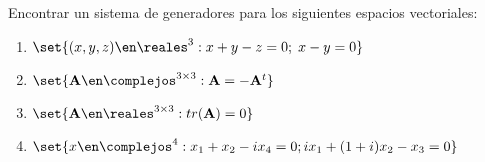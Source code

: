 \begin{enunciado}{\ejercicio}
  Encontrar un sistema de generadores para los siguientes espacios vectoriales:
  \begin{enumerate}[label=(\alph*)]
    \item $\set{(x,y,z) \en \reales^3 : x + y - z = 0;\; x - y = 0}$

    \item $\set{\mathbf{A} \en \complejos^{3 \times 3} : \mathbf{A} = - \mathbf{A}^t}$

    \item $\set{\mathbf{A} \en \reales^{3 \times 3} : tr(\mathbf{A}) = 0}$

    \item $\set{x \en \complejos^4 : x_1 + x_2 - i x_4 = 0; ix_1 + (1+i)x_2 - x_3 = 0}$
  \end{enumerate}
\end{enunciado}

